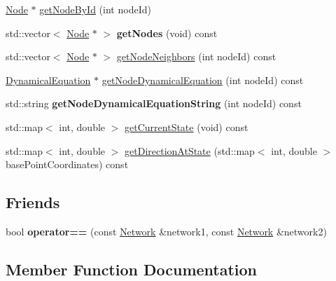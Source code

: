 \begin{DoxyCompactItemize}
\item 
\hyperlink{classNode}{Node} $\ast$ \hyperlink{classNetwork_a0b983325b6f616ab86591f1a5c6b0d69}{get\+Node\+By\+Id} (int node\+Id)
\item 
std\+::vector$<$ \hyperlink{classNode}{Node} $\ast$ $>$ {\bfseries get\+Nodes} (void) const \hypertarget{classNetwork_afb787c0243504190c513013ca198e947}{}\label{classNetwork_afb787c0243504190c513013ca198e947}

\item 
std\+::vector$<$ \hyperlink{classNode}{Node} $\ast$ $>$ \hyperlink{classNetwork_afe7437019956a4677ef9d4df98c36730}{get\+Node\+Neighbors} (int node\+Id) const 
\item 
\hyperlink{classDynamicalEquation}{Dynamical\+Equation} $\ast$ \hyperlink{classNetwork_aecfd002e55cef6a23843d535e75f49e0}{get\+Node\+Dynamical\+Equation} (int node\+Id) const 
\item 
std\+::string {\bfseries get\+Node\+Dynamical\+Equation\+String} (int node\+Id) const \hypertarget{classNetwork_a69e8e7ddd08590f496eeb38d28e5f8dd}{}\label{classNetwork_a69e8e7ddd08590f496eeb38d28e5f8dd}

\item 
std\+::map$<$ int, double $>$ \hyperlink{classNetwork_aa5727c4eb316f69edae5efee422d5c6a}{get\+Current\+State} (void) const 
\item 
std\+::map$<$ int, double $>$ \hyperlink{classNetwork_a140759419ddad1c7dea5537e90c52572}{get\+Direction\+At\+State} (std\+::map$<$ int, double $>$ base\+Point\+Coordinates) const 
\end{DoxyCompactItemize}
\subsection*{Friends}
\begin{DoxyCompactItemize}
\item 
bool {\bfseries operator==} (const \hyperlink{classNetwork}{Network} \&network1, const \hyperlink{classNetwork}{Network} \&network2)\hypertarget{classNetwork_a7a1b02eac9fc1db7f981fe618019d99a}{}\label{classNetwork_a7a1b02eac9fc1db7f981fe618019d99a}

\end{DoxyCompactItemize}


\subsection{Member Function Documentation}
